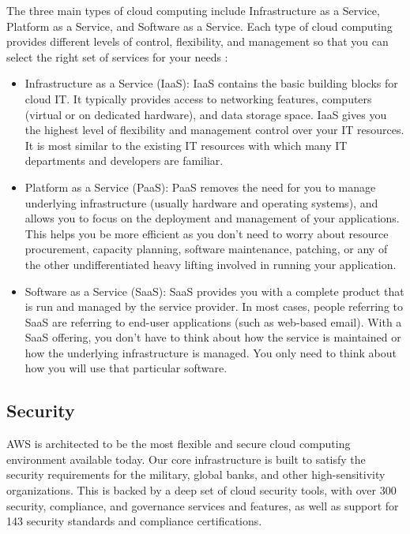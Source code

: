 The three main types of cloud computing include Infrastructure as a Service, Platform as a Service, and Software as a Service. Each type of cloud computing provides different levels of control, flexibility, and management so that you can select the right set of services for your needs \cite{AWSWhatIsCloudComputing}:
\begin{itemize}
    \item Infrastructure as a Service (IaaS): IaaS contains the basic building blocks for cloud IT. It typically provides access to networking features, computers (virtual or on dedicated hardware), and data storage space. IaaS gives you the highest level of flexibility and management control over your IT resources. It is most similar to the existing IT resources with which many IT departments and developers are familiar. 
    \item Platform as a Service (PaaS): PaaS removes the need for you to manage underlying infrastructure (usually hardware and operating systems), and allows you to focus on the deployment and management of your applications. This helps you be more efficient as you don't need to worry about resource procurement, capacity planning, software maintenance, patching, or any of the other undifferentiated heavy lifting involved in running your application. 
    \item Software as a Service (SaaS): SaaS provides you with a complete product that is run and managed by the service provider. In most cases, people referring to SaaS are referring to end-user applications (such as web-based email). With a SaaS offering, you don't have to think about how the service is maintained or how the underlying infrastructure is managed. You only need to think about how you will use that particular software.
\end{itemize}

\subsection{Security}
AWS is architected to be the most flexible and secure cloud computing environment available today. Our core infrastructure is built to satisfy the security requirements for the military, global banks, and other high-sensitivity organizations. This is backed by a deep set of cloud security tools, with over 300 security, compliance, and governance services and features, as well as support for 143 security standards and compliance certifications.

